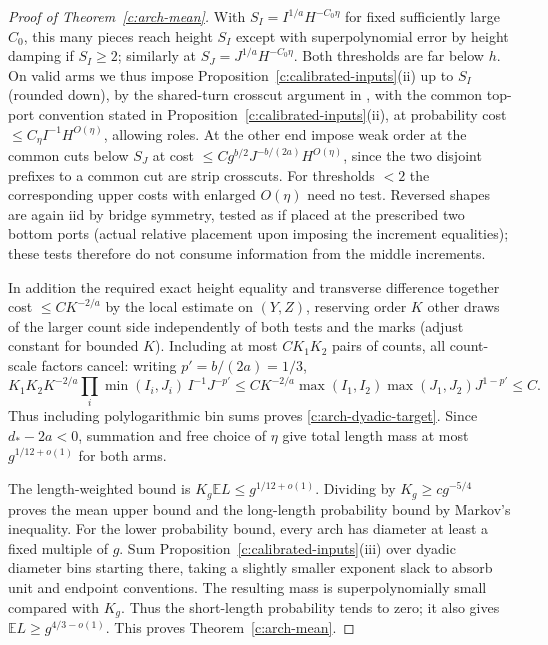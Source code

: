 \documentclass[11pt]{article}
\numberwithin{equation}{section}
\theoremstyle{definition}\newtheorem{definition}[theorem]{Definition}
\theoremstyle{remark}\newtheorem{remark}[theorem]{Remark}
\begin{document}
\begin{proof}[Proof of Theorem~\ref{c:arch-mean}]
With \(S_I=I^{1/a}H^{-C_0\eta}\) for fixed sufficiently large \(C_0\), this many pieces reach height \(S_I\) except with superpolynomial error by height damping if \(S_I\ge2\); similarly at \(S_J=J^{1/a}H^{-C_0\eta}\). Both thresholds are far below \(h\). On valid arms we thus impose Proposition~\ref{c:calibrated-inputs}(ii) up to \(S_I\) (rounded down), by the shared-turn crosscut argument in \cite[Section 7.3]{Renewal}, with the common top-port convention stated in Proposition~\ref{c:calibrated-inputs}(ii), at probability cost \(\le C_\eta I^{-1}H^{O(\eta)}\), allowing roles. At the other end impose weak order at the common cuts below \(S_J\) at cost \(\le C g^{b/2}J^{-b/(2a)}H^{O(\eta)}\), since the two disjoint prefixes to a common cut are strip crosscuts. For thresholds \(<2\) the corresponding upper costs with enlarged \(O(\eta)\) need no test. Reversed shapes are again iid by bridge symmetry, tested as if placed at the prescribed two bottom ports (actual relative placement upon imposing the increment equalities); these tests therefore do not consume information from the middle increments.



In addition the required exact height equality and transverse difference together cost \(\le C K^{-2/a}\) by the local estimate on \((Y,Z)\), reserving order \(K\) other draws of the larger count side independently of both tests and the marks (adjust constant for bounded \(K\)). Including at most \(C K_1 K_2\) pairs of counts, all count-scale factors cancel: writing \(p'=b/(2a)=1/3\),
\[
 K_1K_2 K^{-2/a}\prod_i\min(I_i,J_i)\, I^{-1}J^{-p'}
 \le C K^{-2/a}\max(I_1,I_2)\max(J_1,J_2)J^{1-p'}
 \le C.
\]
Thus including polylogarithmic bin sums proves \eqref{c:arch-dyadic-target}.
Since $d_*-2a<0$, summation and free choice of $\eta$ give total length
mass at most $g^{1/12+o(1)}$ for both arms.

The length-weighted bound is $K_g\mathbb E L\le g^{1/12+o(1)}$.
Dividing by $K_g\ge cg^{-5/4}$ proves the mean upper bound and the
long-length probability bound by Markov's inequality. For the lower
probability bound, every arch has diameter at least a fixed multiple of
$g$. Sum Proposition~\ref{c:calibrated-inputs}(iii) over dyadic diameter
bins starting there, taking a slightly smaller exponent slack to absorb
unit and endpoint conventions. The resulting mass is superpolynomially
small compared with $K_g$. Thus the short-length probability tends to
zero; it also gives $\mathbb E L\ge g^{4/3-o(1)}$. This proves
Theorem~\ref{c:arch-mean}.
\end{proof}
\end{document}
